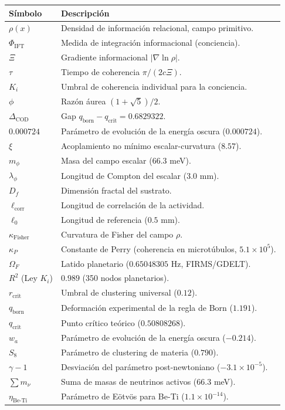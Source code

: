\documentclass[12pt, a4paper]{article}
\theoremstyle{miuThm}
\theoremstyle{remark}
\newcommand{\eps}{0.000724}
\newcommand{\Rtwo}{0.989}
\begin{document}
\begin{longtable}{lp{10cm}}
\toprule
\textbf{Símbolo} & \textbf{Descripción} \\
\midrule
$\rho(x)$ & Densidad de información relacional, campo primitivo. \\
$\Phi_{\text{IFT}}$ & Medida de integración informacional (conciencia). \\
$\Xi$ & Gradiente informacional $|\nabla\ln\rho|$. \\
$\tau$ & Tiempo de coherencia $\pi/(2c\Xi)$. \\
$K_i$ & Umbral de coherencia individual para la conciencia. \\
$\phi$ & Razón áurea $(1+\sqrt5)/2$. \\
$\Delta_{\text{COD}}$ & Gap $q_{\text{born}} - q_{\text{crit}} = 0.6829322$. \\
$\eps$ & Parámetro de evolución de la energía oscura ($0.000724$). \\
$\xi$ & Acoplamiento no mínimo escalar-curvatura ($8.57$). \\
$m_\phi$ & Masa del campo escalar ($66.3$ meV). \\
$\lambda_\phi$ & Longitud de Compton del escalar ($3.0$ mm). \\
$D_f$ & Dimensión fractal del sustrato. \\
$\ell_{\text{corr}}$ & Longitud de correlación de la actividad. \\
$\ell_0$ & Longitud de referencia ($0.5$ mm). \\
$\kappa_{\text{Fisher}}$ & Curvatura de Fisher del campo $\rho$. \\
$\kappa_P$ & Constante de Perry (coherencia en microtúbulos, $5.1\times10^5$). \\
$\Omega_F$ & Latido planetario ($0.65048305$ Hz, FIRMS/GDELT). \\
$R^2$ (Ley $K_i$) & $\Rtwo$ (350 nodos planetarios). \\
$r_{\text{crit}}$ & Umbral de clustering universal ($0.12$). \\
$q_{\text{born}}$ & Deformación experimental de la regla de Born ($1.191$). \\
$q_{\text{crit}}$ & Punto crítico teórico ($0.50808268$). \\
$w_a$ & Parámetro de evolución de la energía oscura ($-0.214$). \\
$S_8$ & Parámetro de clustering de materia ($0.790$). \\
$\gamma-1$ & Desviación del parámetro post-newtoniano ($-3.1\times10^{-5}$). \\
$\sum m_\nu$ & Suma de masas de neutrinos activos ($66.3$ meV). \\
$\eta_{\text{Be-Ti}}$ & Parámetro de Eötvös para Be-Ti ($1.1\times10^{-14}$). \\
\bottomrule
\end{longtable}
\end{document}
